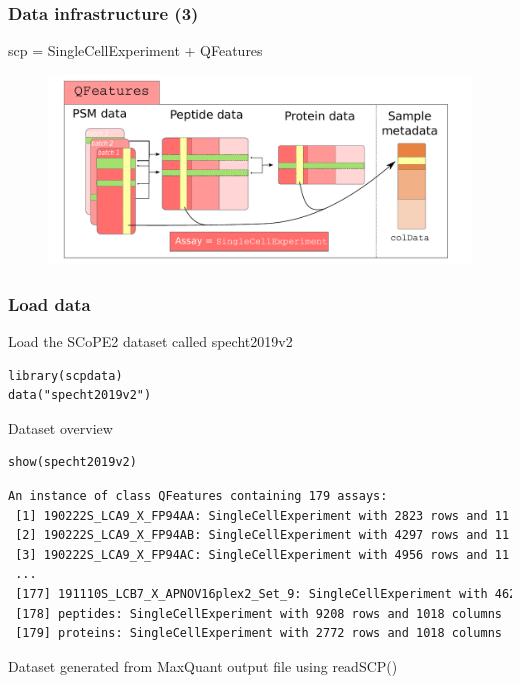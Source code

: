 \documentclass{beamer}
\newcommand{\hcode}[2][lgray]{{\ttfamily\color{vdgray}\colorbox{#1}{#2}}}
\newcommand{\frametitlesection}[1]{\frametitle{\centering #1 \footnotesize \hspace{0pt plus 1 filll} \insertsection}}
\begin{document}
\begin{frame}
    \frametitlesection{Data infrastructure (3)}

    \hcode{scp} = \hcode{SingleCellExperiment} + \hcode{QFeatures}
    \begin{figure}
        \centering
        \includegraphics[width=\linewidth]{figs/SCP_framework.pdf}
    \end{figure}

    
\end{frame}

\begin{frame}[fragile]
    \frametitlesection{Load data}
    
    Load the SCoPE2 dataset called \hcode{specht2019v2}
    
    \begin{lstlisting}
library(scpdata)
data("specht2019v2")
    \end{lstlisting}
    
    Dataset overview
    
    \begin{lstlisting}
show(specht2019v2)
    \end{lstlisting}
    
    \begin{lstlisting}[language = TeX, numbers = none, basicstyle = \tiny\ttfamily\color{vdgray}]
An instance of class QFeatures containing 179 assays:
 [1] 190222S_LCA9_X_FP94AA: SingleCellExperiment with 2823 rows and 11 col...
 [2] 190222S_LCA9_X_FP94AB: SingleCellExperiment with 4297 rows and 11 col...
 [3] 190222S_LCA9_X_FP94AC: SingleCellExperiment with 4956 rows and 11 col...
 ...
 [177] 191110S_LCB7_X_APNOV16plex2_Set_9: SingleCellExperiment with 4626 r...
 [178] peptides: SingleCellExperiment with 9208 rows and 1018 columns
 [179] proteins: SingleCellExperiment with 2772 rows and 1018 columns
    \end{lstlisting}
    
    \bigskip
    \footnotesize
    
    Dataset generated from MaxQuant output file using \hcode{readSCP()}
    
\end{frame}
\end{document}

